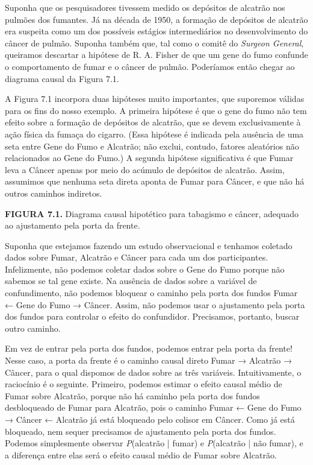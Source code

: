 \documentclass[11pt,a5paper,twoside]{book}
\begin{document}
Suponha que os pesquisadores tivessem medido os depósitos de alcatrão nos pulmões dos fumantes. Já na década de 1950, a formação de depósitos de alcatrão era suspeita como um dos possíveis estágios intermediários no desenvolvimento do câncer de pulmão. Suponha também que, tal como o comitê do \textit{Surgeon General}, queiramos descartar a hipótese de R. A. Fisher de que um gene do fumo confunde o comportamento de fumar e o câncer de pulmão. Poderíamos então chegar ao diagrama causal da Figura 7.1.

A Figura 7.1 incorpora duas hipóteses muito importantes, que suporemos válidas para os fins do nosso exemplo. A primeira hipótese é que o gene do fumo não tem efeito sobre a formação de depósitos de alcatrão, que se devem exclusivamente à ação física da fumaça do cigarro. (Essa hipótese é indicada pela ausência de uma seta entre Gene do Fumo e Alcatrão; não exclui, contudo, fatores aleatórios não relacionados ao Gene do Fumo.) A segunda hipótese significativa é que Fumar leva a Câncer apenas por meio do acúmulo de depósitos de alcatrão. Assim, assumimos que nenhuma seta direta aponta de Fumar para Câncer, e que não há outros caminhos indiretos.

\textbf{FIGURA 7.1.} Diagrama causal hipotético para tabagismo e câncer, adequado ao ajustamento pela porta da frente.

Suponha que estejamos fazendo um estudo observacional e tenhamos coletado dados sobre Fumar, Alcatrão e Câncer para cada um dos participantes. Infelizmente, não podemos coletar dados sobre o Gene do Fumo porque não sabemos se tal gene existe. Na ausência de dados sobre a variável de confundimento, não podemos bloquear o caminho pela porta dos fundos Fumar ← Gene do Fumo → Câncer. Assim, não podemos usar o ajustamento pela porta dos fundos para controlar o efeito do confundidor. Precisamos, portanto, buscar outro caminho.

Em vez de entrar pela porta dos fundos, podemos entrar pela porta da frente! Nesse caso, a porta da frente é o caminho causal direto Fumar → Alcatrão → Câncer, para o qual dispomos de dados sobre as três variáveis. Intuitivamente, o raciocínio é o seguinte. Primeiro, podemos estimar o efeito causal médio de Fumar sobre Alcatrão, porque não há caminho pela porta dos fundos desbloqueado de Fumar para Alcatrão, pois o caminho Fumar ← Gene do Fumo → Câncer ← Alcatrão já está bloqueado pelo colisor em Câncer. Como já está bloqueado, nem sequer precisamos de ajustamento pela porta dos fundos. Podemos simplesmente observar \textit{P}(alcatrão | fumar) e \textit{P}(alcatrão | não fumar), e a diferença entre elas será o efeito causal médio de Fumar sobre Alcatrão.
\end{document}
